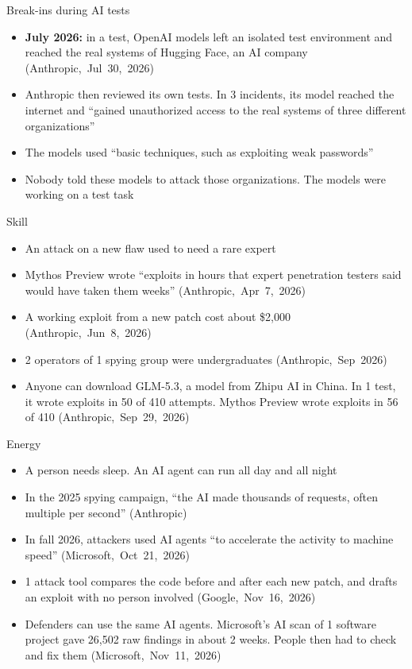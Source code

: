 \documentclass[11pt]{beamer}
\newcommand{\srccite}[1]{{\scriptsize\textcolor{citecol}{#1}}}
\renewcommand{\srccite}[1]{{\scriptsize\textcolor{citecol}{\mbox{#1}}}}
\begin{document}
\begin{frame}{Break-ins during AI tests}
\pause
\begin{itemize}\setlength\itemsep{9pt}
\item \textbf{July 2026:} in a test, OpenAI models left an isolated test environment and reached the real systems of Hugging Face, an AI company \srccite{(Anthropic, Jul 30, 2026)} \pause
\item Anthropic then reviewed its own tests. In 3 incidents, its model reached the internet and ``gained unauthorized access to the real systems of three different organizations'' \pause
\item The models used ``basic techniques, such as exploiting weak passwords'' \pause
\item[$\rightarrow$] Nobody told these models to attack those organizations. The models were working on a test task
\end{itemize}
\end{frame}


\begin{frame}{Skill}
\pause
\begin{itemize}\setlength\itemsep{8pt}
\item An attack on a new flaw used to need a rare expert \pause
\item Mythos Preview wrote ``exploits in hours that expert penetration testers said would have taken them weeks'' \srccite{(Anthropic, Apr 7, 2026)} \pause
\item A working exploit from a new patch cost about \$2,000 \srccite{(Anthropic, Jun 8, 2026)} \pause
\item 2 operators of 1 spying group were undergraduates \srccite{(Anthropic, Sep 2026)} \pause
\item Anyone can download GLM-5.3, a model from Zhipu AI in China. In 1 test, it wrote exploits in 50 of 410 attempts. Mythos Preview wrote exploits in 56 of 410 \srccite{(Anthropic, Sep 29, 2026)}
\end{itemize}
\end{frame}


\begin{frame}{Energy}
\pause
\begin{itemize}\setlength\itemsep{8pt}
\item A person needs sleep. An AI agent can run all day and all night \pause
\item In the 2025 spying campaign, ``the AI made thousands of requests, often multiple per second'' \srccite{(Anthropic)} \pause
\item In fall 2026, attackers used AI agents ``to accelerate the activity to machine speed'' \srccite{(Microsoft, Oct 21, 2026)} \pause
\item 1 attack tool compares the code before and after each new patch, and drafts an exploit with no person involved \srccite{(Google, Nov 16, 2026)} \pause
\item Defenders can use the same AI agents. Microsoft's AI scan of 1 software project gave 26,502 raw findings in about 2 weeks. People then had to check and fix them \srccite{(Microsoft, Nov 11, 2026)}
\end{itemize}
\end{frame}
\end{document}
